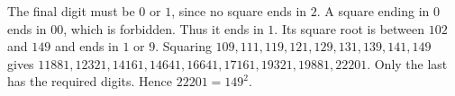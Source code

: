 The final digit must be $0$ or $1$, since no square ends in $2$. A square ending in $0$ ends in $00$, which is forbidden. Thus it ends in $1$. Its square root is between $102$ and $149$ and ends in $1$ or $9$. Squaring $109,111,119,121,129,131,139,141,149$ gives $11881,12321,14161,14641,16641,17161,19321,19881,22201$. Only the last has the required digits. Hence $\boxed{22201=149^2}$.

